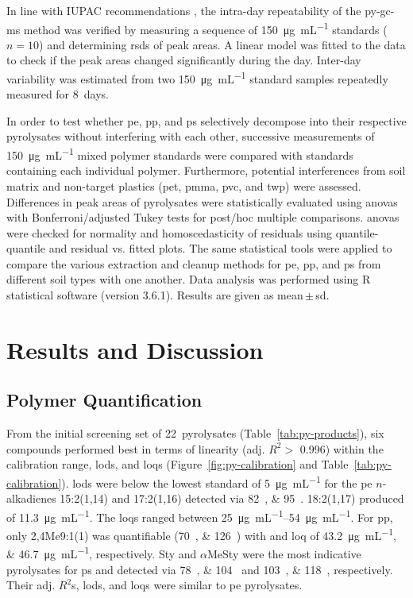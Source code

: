 In line with IUPAC recommendations \citep{CurrieNomenclature1995}, the intra-day repeatability of the \ac{py-gc-ms} method was verified by measuring a sequence of \SI{150}{\micro\gram\per\milli\liter} standards ($n = 10$) and determining \acp{rsd} of peak areas. A linear model was fitted to the data to check if the peak areas changed significantly during the day. Inter-day variability was estimated from two \SI{150}{\micro\gram\per\milli\liter} standard samples repeatedly measured for \num{8}~days.

In order to test whether \ac{pe}, \ac{pp}, and \ac{ps} selectively decompose into their respective pyrolysates without interfering with each other, successive measurements of \SI{150}{\micro\gram\per\milli\liter} mixed polymer standards were compared with standards containing each individual polymer. Furthermore, potential interferences from soil matrix and non-target plastics (\ac{pet}, \ac{pmma}, \ac{pvc}, and \ac{twp}) were assessed. Differences in peak areas of pyrolysates were statistically evaluated using \acp{anova} with Bonferroni\-/adjusted Tukey tests for post\-/hoc multiple comparisons. \Acp{anova} were checked for normality and homoscedasticity of residuals using quantile\--quantile and residual vs. fitted plots.
The same statistical tools were applied to compare the various extraction and cleanup methods for \ac{pe}, \ac{pp}, and \ac{ps} from different soil types with one another.
Data analysis was performed using R statistical software (version 3.6.1).
Results are given as mean\,$\pm$\,\ac{sd}.

\section{Results and Discussion}

\subsection{Polymer Quantification}

From the initial screening set of 22~pyrolysates (Table~\ref{tab:py-products}), six compounds performed best in terms of linearity (adj. $R^2 >$ \num{0.996}) within the calibration range, \acp{lod}, and \acp{loq} (Figure~\ref{fig:py-calibration} and Table~\ref{tab:py-calibration}). \Acp{lod} were below the lowest standard of \SI{5}{\micro\gram\per\milli\liter} for the \ac{pe} $n$-alkadienes 15:2(1,14) and 17:2(1,16) detected via \SIlist{82;95}{\mz}. 18:2(1,17) produced  of \SI{11.3}{\micro\gram\per\milli\liter}. The \acp{loq} ranged between \SIrange[range-phrase = { and }]{25}{54}{\micro\gram\per\milli\liter}.
For \ac{pp}, only 2,4Me9:1(1) was quantifiable (\SIlist{70;126}{\mz}) with  and \ac{loq} of \SIlist{43.2;46.7}{\micro\gram\per\milli\liter}, respectively.
Sty and $\alpha$MeSty were the most indicative pyrolysates for \ac{ps} and detected via \SIlist{78;104}{\mz} and \SIlist{103;118}{\mz}, respectively. Their adj. $R^2$s, \acp{lod}, and \acp{loq} were similar to \ac{pe} pyrolysates.

